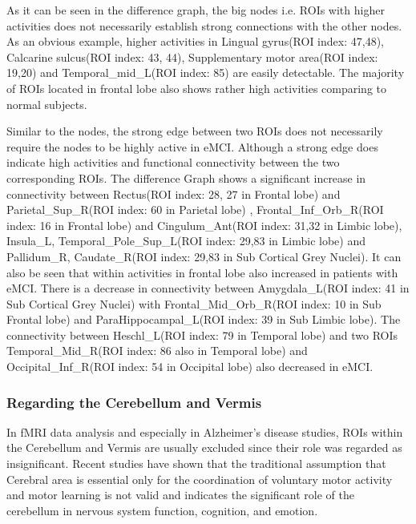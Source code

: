 \documentclass[journal]{IEEEtran}
\begin{document}
	As it can be seen in the difference graph, the big nodes i.e. ROIs with higher activities does not necessarily establish strong connections with the other nodes. As an obvious example, higher activities in Lingual gyrus(ROI index: 47,48)\cite{r25}, Calcarine sulcus(ROI index: 43, 44)\cite{r26,r27}, Supplementary motor area(ROI index: 19,20)\cite{r27,r28} and Temporal\_mid\_L(ROI index: 85)\cite{r29} are easily detectable. The majority of ROIs located in frontal lobe also shows rather high activities comparing to normal subjects\cite{r30,r04}.
	
	Similar to the nodes, the strong edge between two ROIs does not necessarily require the nodes to be highly active in eMCI. Although a strong edge does indicate high activities and functional connectivity between the two corresponding ROIs. The difference Graph shows a significant increase in connectivity between 
	Rectus(ROI index: 28, 27 in Frontal lobe) and 
	Parietal\_Sup\_R(ROI index: 60 in Parietal lobe) \cite{r40, r41},
	Frontal\_Inf\_Orb\_R(ROI index: 16 in Frontal lobe) and
	Cingulum\_Ant(ROI index: 31,32 in Limbic lobe)\cite{r42},
	Insula\_L, Temporal\_Pole\_Sup\_L(ROI index: 29,83 in Limbic lobe) and
	Pallidum\_R, Caudate\_R(ROI index: 29,83 in Sub Cortical Grey Nuclei)\cite{r43}. It can also be seen that within activities in frontal lobe also increased in patients with eMCI\cite{r44}. There is a decrease in connectivity between Amygdala\_L(ROI index: 41 in Sub Cortical Grey Nuclei) with Frontal\_Mid\_Orb\_R(ROI index: 10 in Sub Frontal lobe) and ParaHippocampal\_L(ROI index: 39 in Sub Limbic lobe)\cite{r45}. The connectivity between Heschl\_L(ROI index: 79 in Temporal lobe) and two ROIs Temporal\_Mid\_R(ROI index: 86 also in Temporal lobe) and Occipital\_Inf\_R(ROI index: 54 in Occipital lobe) also decreased in eMCI\cite{r46}. 
	
	\subsubsection*{\textbf{Regarding the Cerebellum and Vermis}}
	In fMRI data analysis and especially in Alzheimer's disease studies, ROIs within the Cerebellum and Vermis are usually excluded since their role was regarded as insignificant\cite{r47, r48}. Recent studies have shown that the traditional assumption that Cerebral area is essential only for the coordination of voluntary motor activity and motor learning is not valid and indicates the significant role of the cerebellum in nervous system function, cognition, and emotion\cite{r32}. 
	
\end{document}
